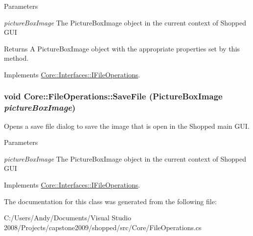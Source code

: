 \begin{DoxyParams}{Parameters}
\item[{\em pictureBoxImage}]The PictureBoxImage object in the current context of Shopped GUI \end{DoxyParams}
\begin{DoxyReturn}{Returns}
A PictureBoxImage object with the appropriate properties set by this method. 
\end{DoxyReturn}


Implements \hyperlink{interface_core_1_1_interfaces_1_1_i_file_operations}{Core::Interfaces::IFileOperations}.\hypertarget{class_core_1_1_file_operations_a0fc5427e96d79e70c6409ec22e70abba}{
\subsubsection[{SaveFile}]{\setlength{\rightskip}{0pt plus 5cm}void Core::FileOperations::SaveFile ({\bf PictureBoxImage} {\em pictureBoxImage})}}
\label{class_core_1_1_file_operations_a0fc5427e96d79e70c6409ec22e70abba}
Opens a save file dialog to save the image that is open in the Shopped main GUI.


\begin{DoxyParams}{Parameters}
\item[{\em pictureBoxImage}]The PictureBoxImage object in the current context of Shopped GUI \end{DoxyParams}


Implements \hyperlink{interface_core_1_1_interfaces_1_1_i_file_operations}{Core::Interfaces::IFileOperations}.

The documentation for this class was generated from the following file:\begin{DoxyCompactItemize}
\item 
C:/Users/Andy/Documents/Visual Studio 2008/Projects/capstone2009/shopped/src/Core/FileOperations.cs\end{DoxyCompactItemize}
